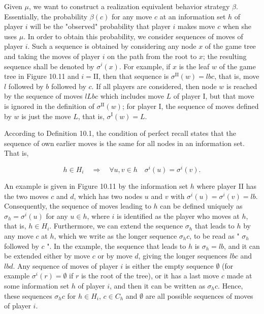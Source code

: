 \documentclass[12pt]{article}
\begin{document}
Given $\mu$, we want to construct a realization equivalent behavior strategy $\beta$. Essentially, the probability $\beta(c)$ for any move $c$ at an information set $h$ of player $i$ will be the "observed" probability that player $i$ makes move $c$ when she uses $\mu$. In order to obtain this probability, we consider sequences of moves of player $i$. Such a sequence is obtained by considering any node $x$ of the game tree and taking the moves of player $i$ on the path from the root to $x$; the resulting sequence shall be denoted by $\sigma^{i}(x)$. For example, if $x$ is the leaf $w$ of the game tree in Figure 10.11 and $i=\mathrm{II}$, then that sequence is $\sigma^{\mathrm{II}}(w)=l b c$, that is, move $l$ followed by $b$ followed by $c$. If all players are considered, then node $w$ is reached by the sequence of moves $l L b c$ which includes move $L$ of player I, but that move is ignored in the definition of $\sigma^{\mathrm{II}}(w)$; for player I, the sequence of moves defined by $w$ is just the move $L$, that is, $\sigma^{\mathrm{I}}(w)=L$.

According to Definition 10.1, the condition of perfect recall states that the sequence of own earlier moves is the same for all nodes in an information set. That is,

$$
h \in H_{i} \quad \Rightarrow \quad \forall u, v \in h \quad \sigma^{i}(u)=\sigma^{i}(v) .
$$

An example is given in Figure 10.11 by the information set $h$ where player II has the two moves $c$ and $d$, which has two nodes $u$ and $v$ with $\sigma^{i}(u)=\sigma^{i}(v)=l b$. Consequently, the sequence of moves leading to $h$ can be defined uniquely as $\sigma_{h}=\sigma^{i}(u)$ for any $u \in h$, where $i$ is identified as the player who moves at $h$, that is, $h \in H_{i}$. Furthermore, we can extend the sequence $\sigma_{h}$ that leads to $h$ by any move $c$ at $h$, which we write as the longer sequence $\sigma_{h} c$, to be read as " $\sigma_{h}$ followed by $c$ ". In the example, the sequence that leads to $h$ is $\sigma_{h}=l b$, and it can be extended either by move $c$ or by move $d$, giving the longer sequences $l b c$ and $l b d$. Any sequence of moves of player $i$ is either the empty sequence $\emptyset$ (for example $\sigma^{i}(r)=\emptyset$ if $r$ is the root of the tree), or it has a last move $c$ made at some information set $h$ of player $i$, and then it can be written as $\sigma_{h} c$. Hence, these sequences $\sigma_{h} c$ for $h \in H_{i}$, $c \in C_{h}$ and $\emptyset$ are all possible sequences of moves of player $i$.
\end{document}
